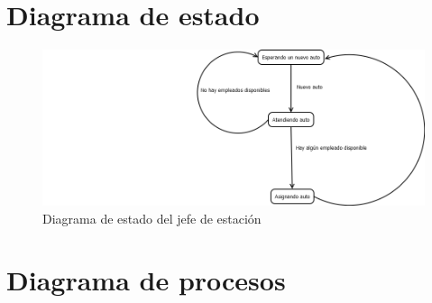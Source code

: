 \documentclass[12pt,a4paper,titlepage,oneside]{article}
\begin{document}
\section{Diagrama de estado}
\begin{figure}[hbtp]
\begin{center}
\includegraphics[scale=0.5]{diagrama_estado_jefe.png}
\end{center}
\caption[Long caption]{Diagrama de estado del jefe de estación}
\end{figure}

\section{Diagrama de procesos}
\end{document}
